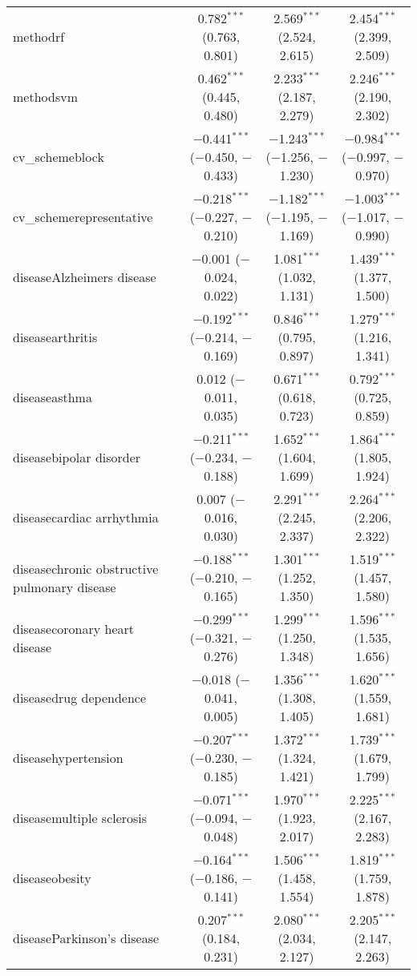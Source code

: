 \begin{table}[!htbp]
\begin{tabular}{@{\extracolsep{5pt}}lccc}
  methodrf & 0.782$^{***}$ (0.763, 0.801) & 2.569$^{***}$ (2.524, 2.615) & 2.454$^{***}$ (2.399, 2.509) \\ 
  methodsvm & 0.462$^{***}$ (0.445, 0.480) & 2.233$^{***}$ (2.187, 2.279) & 2.246$^{***}$ (2.190, 2.302) \\ 
  cv\_schemeblock & $-$0.441$^{***}$ ($-$0.450, $-$0.433) & $-$1.243$^{***}$ ($-$1.256, $-$1.230) & $-$0.984$^{***}$ ($-$0.997, $-$0.970) \\ 
  cv\_schemerepresentative & $-$0.218$^{***}$ ($-$0.227, $-$0.210) & $-$1.182$^{***}$ ($-$1.195, $-$1.169) & $-$1.003$^{***}$ ($-$1.017, $-$0.990) \\ 
  diseaseAlzheimers disease & $-$0.001 ($-$0.024, 0.022) & 1.081$^{***}$ (1.032, 1.131) & 1.439$^{***}$ (1.377, 1.500) \\ 
  diseasearthritis & $-$0.192$^{***}$ ($-$0.214, $-$0.169) & 0.846$^{***}$ (0.795, 0.897) & 1.279$^{***}$ (1.216, 1.341) \\ 
  diseaseasthma & 0.012 ($-$0.011, 0.035) & 0.671$^{***}$ (0.618, 0.723) & 0.792$^{***}$ (0.725, 0.859) \\ 
  diseasebipolar disorder & $-$0.211$^{***}$ ($-$0.234, $-$0.188) & 1.652$^{***}$ (1.604, 1.699) & 1.864$^{***}$ (1.805, 1.924) \\ 
  diseasecardiac arrhythmia & 0.007 ($-$0.016, 0.030) & 2.291$^{***}$ (2.245, 2.337) & 2.264$^{***}$ (2.206, 2.322) \\ 
  diseasechronic obstructive pulmonary disease & $-$0.188$^{***}$ ($-$0.210, $-$0.165) & 1.301$^{***}$ (1.252, 1.350) & 1.519$^{***}$ (1.457, 1.580) \\ 
  diseasecoronary heart disease & $-$0.299$^{***}$ ($-$0.321, $-$0.276) & 1.299$^{***}$ (1.250, 1.348) & 1.596$^{***}$ (1.535, 1.656) \\ 
  diseasedrug dependence & $-$0.018 ($-$0.041, 0.005) & 1.356$^{***}$ (1.308, 1.405) & 1.620$^{***}$ (1.559, 1.681) \\ 
  diseasehypertension & $-$0.207$^{***}$ ($-$0.230, $-$0.185) & 1.372$^{***}$ (1.324, 1.421) & 1.739$^{***}$ (1.679, 1.799) \\ 
  diseasemultiple sclerosis & $-$0.071$^{***}$ ($-$0.094, $-$0.048) & 1.970$^{***}$ (1.923, 2.017) & 2.225$^{***}$ (2.167, 2.283) \\ 
  diseaseobesity & $-$0.164$^{***}$ ($-$0.186, $-$0.141) & 1.506$^{***}$ (1.458, 1.554) & 1.819$^{***}$ (1.759, 1.878) \\ 
  diseaseParkinson's disease & 0.207$^{***}$ (0.184, 0.231) & 2.080$^{***}$ (2.034, 2.127) & 2.205$^{***}$ (2.147, 2.263) \\ 

\end{tabular}
\end{table}
